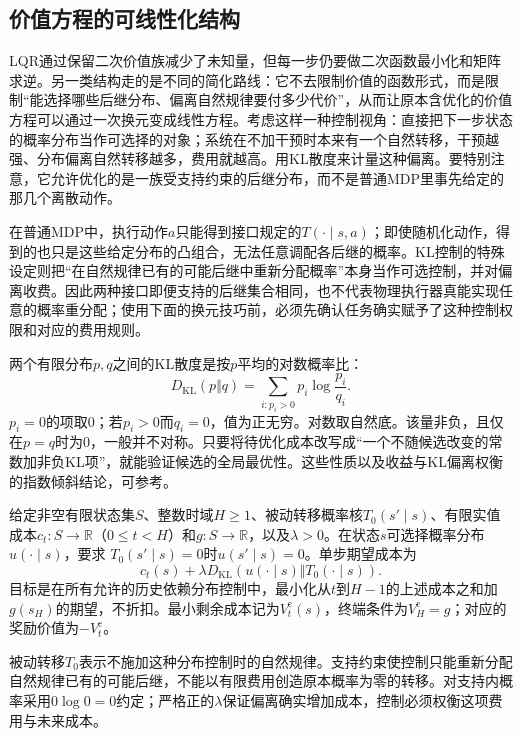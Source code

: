 \subsection{价值方程的可线性化结构}
\label{sec:rl-planning-kl-control}

LQR通过保留二次价值族减少了未知量，但每一步仍要做二次函数最小化和矩阵求逆。另一类结构走的是不同的简化路线：它不去限制价值的函数形式，而是限制“能选择哪些后继分布、偏离自然规律要付多少代价”，从而让原本含优化的价值方程可以通过一次换元变成线性方程。考虑这样一种控制视角：直接把下一步状态的概率分布当作可选择的对象；系统在不加干预时本来有一个自然转移，干预越强、分布偏离自然转移越多，费用就越高。用KL散度来计量这种偏离。要特别注意，它允许优化的是一族受支持约束的后继分布，而不是普通MDP里事先给定的那几个离散动作。

在普通MDP中，执行动作$a$只能得到接口规定的$T(\cdot\mid s,a)$；即使随机化动作，得到的也只是这些给定分布的凸组合，无法任意调配各后继的概率。KL控制的特殊设定则把“在自然规律已有的可能后继中重新分配概率”本身当作可选控制，并对偏离收费。因此两种接口即便支持的后继集合相同，也不代表物理执行器真能实现任意的概率重分配；使用下面的换元技巧前，必须先确认任务确实赋予了这种控制权限和对应的费用规则。

两个有限分布$p,q$之间的KL散度是按$p$平均的对数概率比：
\[
 D_{\mathrm{KL}}(p\Vert q)=\sum_{i:p_i>0}p_i\log\frac{p_i}{q_i}.
\]
$p_i=0$的项取0；若$p_i>0$而$q_i=0$，值为正无穷。对数取自然底。该量非负，且仅在$p=q$时为0，一般并不对称。只要将待优化成本改写成“一个不随候选改变的常数加非负KL项”，就能验证候选的全局最优性。这些性质以及收益与KL偏离权衡的指数倾斜结论，可参考。

\begin{definition}[有限时域KL控制]
 \label{def:rl-planning-kl-control}
 给定非空有限状态集$S$、整数时域$H\geq1$、被动转移概率核$T_0(s'\mid s)$、有限实值成本$c_t:S\to\mathbb R$（$0\leq t<H$）和$g:S\to\mathbb R$，以及$\lambda>0$。在状态$s$可选择概率分布$u(\cdot\mid s)$，要求
 $T_0(s'\mid s)=0$时$u(s'\mid s)=0$。单步期望成本为
 \[
 c_t(s)+\lambda D_{\mathrm{KL}}(u(\cdot\mid s)\Vert T_0(\cdot\mid s)).
 \]
 目标是在所有允许的历史依赖分布控制中，最小化从$t$到$H-1$的上述成本之和加$g(s_H)$的期望，不折扣。最小剩余成本记为$V_t^{\mathrm c}(s)$，终端条件为$V_H^{\mathrm c}=g$；对应的奖励价值为$-V_t^{\mathrm c}$。
\end{definition}

被动转移$T_0$表示不施加这种分布控制时的自然规律。支持约束使控制只能重新分配自然规律已有的可能后继，不能以有限费用创造原本概率为零的转移。对支持内概率采用$0\log0=0$约定；严格正的$\lambda$保证偏离确实增加成本，控制必须权衡这项费用与未来成本。

